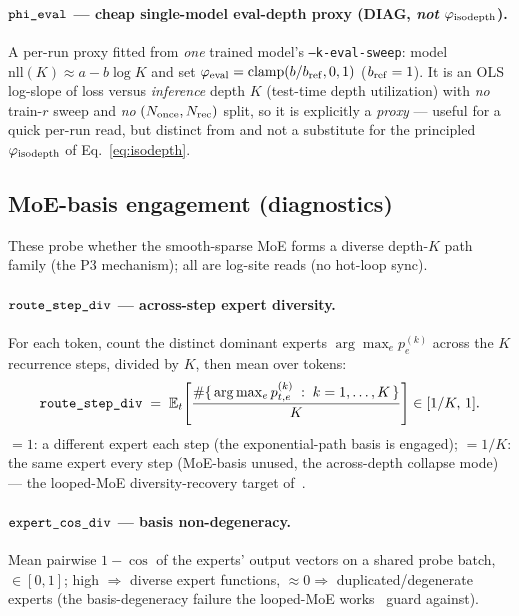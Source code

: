 \documentclass[11pt]{article}
\newcommand{\E}{\mathbb{E}}
\newcommand{\code}[1]{\texttt{#1}}
\newcommand{\DIAG}{\textcolor{diag}{\textbf{DIAG}}}
\begin{document}
\paragraph{\(\code{\detokenize{phi_eval}}\) --- cheap single-model eval-depth proxy (\DIAG, \emph{not} \(\varphi_{\rm isodepth}\)).}
A per-run proxy fitted from \emph{one} trained model's \code{--k-eval-sweep}: model
\(\mathrm{nll}(K)\approx a-b\log K\) and set \(\varphi_{\rm eval}=\mathrm{clamp}(b/b_{\rm ref},0,1)\)
(\(b_{\rm ref}=1\)).  It is an OLS log-slope of loss versus \emph{inference} depth \(K\) (test-time depth
utilization) with \emph{no} train-\(r\) sweep and \emph{no} \((N_{\rm once},N_{\rm rec})\) split, so it
is explicitly a \emph{proxy} --- useful for a quick per-run read, but distinct from and not a substitute
for the principled \(\varphi_{\rm isodepth}\) of Eq.~\eqref{eq:isodepth}.

\subsection{MoE-basis engagement (diagnostics)}
\label{ssec:moe}
These probe whether the smooth-sparse MoE forms a diverse depth-\(K\) path family (the P3 mechanism);
all are log-site reads (no hot-loop sync).

\paragraph{\(\code{\detokenize{route_step_div}}\) --- across-step expert diversity.}
For each token, count the distinct dominant experts \(\arg\max_e p^{(k)}_e\) across the \(K\) recurrence
steps, divided by \(K\), then mean over tokens:
\begin{equation}
\label{eq:route-step-div}
  \code{\detokenize{route_step_div}}
  \;=\;
  \E_t\!\left[\frac{\#\{\,\arg\max_e p^{(k)}_{t,e}\;:\;k=1,\dots,K\,\}}{K}\right]\in[1/K,\,1].
\end{equation}
\(=1\): a different expert each step (the exponential-path basis is engaged); \(=1/K\): the same expert
every step (MoE-basis unused, the across-depth collapse mode) --- the looped-MoE diversity-recovery
target of~\cite{moeut,sparseloopedmoe}.

\paragraph{\(\code{\detokenize{expert_cos_div}}\) --- basis non-degeneracy.}
Mean pairwise \(1-\cos\) of the experts' output vectors on a shared probe batch, \(\in[0,1]\); high
\(\Rightarrow\) diverse expert functions, \(\approx0\Rightarrow\) duplicated/degenerate experts (the
basis-degeneracy failure the looped-MoE works~\cite{moeut,sparseloopedmoe} guard against).
\end{document}
